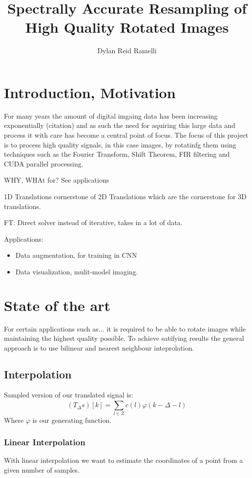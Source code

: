 \documentclass[]{usiinfbachelorproject}
\title{Spectrally Accurate Resampling of High Quality Rotated Images}
\author{Dylan Reid Ramelli}
\begin{document}
	
	\maketitle	
	\section{Introduction, Motivation}\label{introduction}
	For many years the amount of digital imgaing data has been increasing exponentially (citation) and as such the need for aquiring this large data and process it with care has become a central point of focus. The focus of this project is to process high quality signals, in this case images, by rotatinfg them using techniques such as the Fourier Transform, Shift Theorem, FIR filtering and CUDA parallel processing.
	
	WHY, WHAt for? See applications
	
	
	1D Translations cornerstone of 2D Translations which are the cornerstone for 3D translations.
	
	FT: Direct solver instead of iterative, takes in a lot of data.
	
	Applications:
	\begin{itemize}
		\item Data augmentation, for training in CNN
		\item Data visualization, mulit-model imaging.
	\end{itemize}
	
	\section{State of the art}
	For certain applications such as... it is required to be able to rotate images while maintaining the highest quality possible. To achieve satifying results the general approach is to use bilinear and nearest neighbour inteprolation.
	
	
	
	
	\iffalse
	
	\subsection{Interpolation}
	Sampled version of our translated signal is:
	\begin{equation}
		(T_\Delta s)[k] = \sum_{l \in Z}^{} c(l)\varphi(k - \Delta - l)
	\end{equation}
	Where $\varphi$ is our generating function.
	\subsubsection{Linear Interpolation}
	With linear interpolation we want to estimate the coordinates of a point from a given number of samples. 
	
\end{document}
